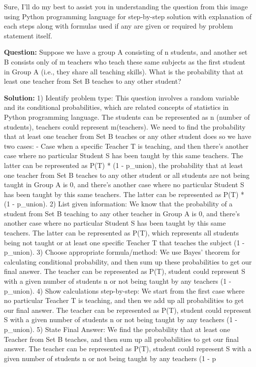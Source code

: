 Sure, I'll do my best to assist you in understanding the question from this image using Python programming language for step-by-step solution with explanation of each steps along with formulas used if any are given or required by problem statement itself. 

\textbf{Question:} Suppose we have a group A consisting of n students, and another set B consists only of m teachers who teach these same subjects as the first student in Group A (i.e., they share all teaching skills). What is the probability that at least one teacher from Set B teaches to any other student?

\textbf{Solution:} 
1) Identify problem type: This question involves a random variable and its conditional probabilities, which are related concepts of statistics in Python programming language. The students can be represented as n (number of students), teachers could represent m(teachers). We need to find the probability that at least one teacher from Set B teaches or any other student does so we have two cases: 
- Case when a specific Teacher T is teaching, and then there's another case where no particular Student S has been taught by this same teachers. The latter can be represented as P(T) * (1 - p_union), the probability that at least one teacher from Set B teaches to any other student or all students are not being taught in Group A is 0, and there's another case where no particular Student S has been taught by this same teachers. The latter can be represented as P(T) * (1 - p_union).
2) List given information: We know that the probability of a student from Set B teaching to any other teacher in Group A is 0, and there's another case where no particular Student S has been taught by this same teachers. The latter can be represented as P(T), which represents all students being not taught or at least one specific Teacher T that teaches the subject (1 - p_union).
3) Choose appropriate formula/method: We use Bayes' theorem for calculating conditional probability, and then sum up these probabilities to get our final answer.  The teacher can be represented as P(T), student could represent S with a given number of students n or not being taught by any teachers (1 - p_union).
4) Show calculations step-by-step: We start from the first case where no particular Teacher T is teaching, and then we add up all probabilities to get our final answer.  The teacher can be represented as P(T), student could represent S with a given number of students n or not being taught by any teachers (1 - p_union).
5) State Final Answer: We find the probability that at least one Teacher from Set B teaches, and then sum up all probabilities to get our final answer.  The teacher can be represented as P(T), student could represent S with a given number of students n or not being taught by any teachers (1 - p
